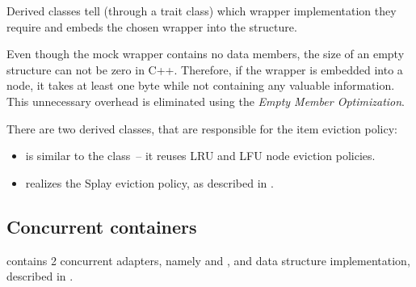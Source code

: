 Derived classes tell  (through a trait class) which wrapper implementation they require and  embeds the chosen wrapper into the  structure.

Even though the mock wrapper contains no data members, the size of an empty structure can not be zero in C++\cite{sizeof_empty}. Therefore, if the wrapper is embedded into a node, it takes at least one byte while not containing any valuable information. This unnecessary overhead is eliminated using the \emph{Empty Member Optimization}\cite{ebo}.


There are two derived classes, that are responsible for the item eviction policy:
 \begin{itemize}[leftmargin=2cm]
 \item [\classname{SplayTreeFairLu}] is similar to the  class~-- it reuses LRU and LFU node eviction policies.
 \item [\classname{SplayTreeBottomNode}] realizes the Splay eviction policy, as described in .
\end{itemize}

\subsection{Concurrent containers}
  \numdbname contains 2 concurrent adapters, namely  and , and \cndcname data structure implementation, described in .

